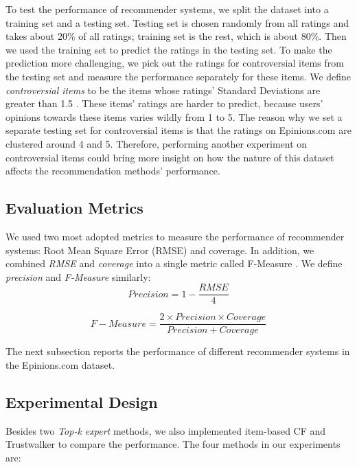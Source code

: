 \documentclass[12pt]{article}
\begin{document}
To test the performance of recommender systems, we split the dataset into a training set and a testing set. Testing set is chosen randomly from all ratings and takes about 20\% of all ratings; training set is the rest, which is about 80\%. Then we used the training set to predict the ratings in the testing set. To make the prediction more challenging, we pick out the ratings for controversial items from the testing set and measure the performance separately for these items. We define \emph{controversial items} to be the items whose ratings' Standard Deviations are greater than 1.5 \cite{Massa:2007p437}. These items' ratings are harder to predict, because users' opinions towards these items varies wildly from 1 to 5. The reason why we set a separate testing set for controversial items is that the ratings on Epinions.com are clustered around 4 and 5. Therefore, performing another experiment on controversial items could bring more insight on how the nature of this dataset affects the recommendation methods' performance. 


\subsection{Evaluation Metrics}

We used two most adopted metrics to measure the performance of recommender systems: Root Mean Square Error (RMSE) and coverage. In addition, we combined \emph{RMSE} and \emph{coverage} into a single metric called F-Measure \cite{Jamali:2009p67}. We define \emph{precision} and \emph{F-Measure} similarly:
\begin{equation}
Precision = 1 - \frac{RMSE}{4}
\end{equation}

\begin{equation}
F-Measure = \frac{2 \times Precision \times Coverage}{Precision + Coverage}
\end{equation}

The next subsection reports the performance of different recommender systems in the Epinions.com dataset. 


\subsection{Experimental Design}
Besides two \emph{Top-k expert} methods, we also implemented item-based CF and Trustwalker to compare the performance. The four methods in our experiments are:
\end{document}
